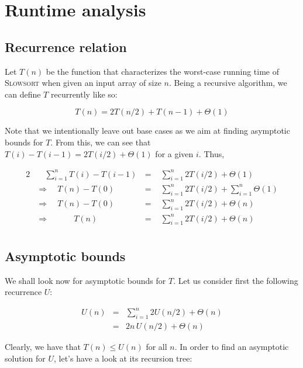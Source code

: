 \documentclass[a4paper,10pt]{article}
\newcommand{\SSort}{\textsc{Slowsort }}
\begin{document}
\section{Runtime analysis}

\subsection{Recurrence relation}

Let $T(n)$ be the function that characterizes the worst-case running time of \SSort when given an input array of size $n$. Being a recursive algorithm, we can define $T$ recurrently like so:

$$T(n) = 2T(n/2) + T(n-1) + \Theta(1)$$

\vspace{0.1cm}
Note that we intentionally leave out base cases as we aim at finding asymptotic bounds for $T$. From this, we can see that $T(i) - T(i-1) = 2T(i/2) + \Theta(1)$ for a given $i$. Thus,

\begin{alignat*}{2}
    &\quad \displaystyle \sum_{i = 1}^{n}{T(i) - T(i-1)} \, &= & \,\, \displaystyle \sum_{i = 1}^{n}{2T(i/2) + \Theta(1)} \\
    &\Rightarrow \quad T(n) - T(0) &=& \,\, \displaystyle \sum_{i = 1}^{n}{2T(i/2)} + \displaystyle \sum_{i = 1}^{n}{\Theta(1)} \\
    &\Rightarrow \quad T(n) - T(0) &=& \,\, \displaystyle \sum_{i = 1}^{n}{2T(i/2)} + \Theta(n) \\
    &\Rightarrow \quad\quad\quad T(n) &=& \,\, \displaystyle \sum_{i = 1}^{n}{2T(i/2)} + \Theta(n) \\
\end{alignat*}

\subsection{Asymptotic bounds}

We shall look now for asymptotic bounds for $T$. Let us consider first the following recurrence $U$:

\begin{eqnarray*}
    U(n) &=& \displaystyle \sum_{i = 1}^{n}{2U(n/2)} + \Theta(n) \\
         &=& 2n \, U(n/2) + \Theta(n)
\end{eqnarray*}

Clearly, we have that $T(n) \leq U(n)$ for all $n$. In order to find an asymptotic solution for $U$, let's have a look at its recursion tree:\\
\end{document}
